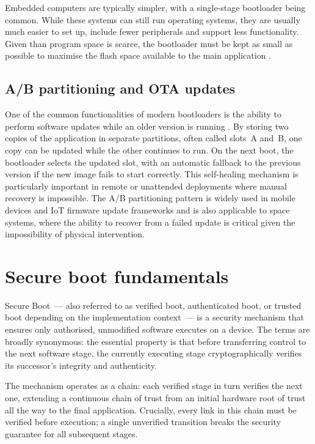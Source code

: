 Embedded computers are typically simpler, with a single-stage bootloader being common. While these systems can still run operating systems, they are usually much easier to set up, include fewer peripherals and support less functionality. Given than program space is scarce, the bootloader must be kept as small as possible to maximise the flash space available to the main application \cite{beningo_2015, wolfBoot}.

\subsection{A/B partitioning and OTA updates}
\label{subsection:bg-bootloader-ABandOTA}

One of the common functionalities of modern bootloaders is the ability to perform software updates while an older version is running \cite{android_ota_updating_2026, rfc9019, wolfBoot}. By storing two copies of the application in separate partitions, often called slots~A and~B, one copy can be updated while the other continues to run. On the next boot, the bootloader selects the updated slot, with an automatic fallback to the previous version if the new image fails to start correctly. This self-healing mechanism is particularly important in remote or unattended deployments where manual recovery is impossible. The A/B partitioning pattern is widely used in mobile devices and IoT firmware update frameworks \cite{android_ota_updating_2026, rfc9019, beningo_2015} and is also applicable to space systems, where the ability to recover from a failed update is critical given the impossibility of physical intervention.

\section{Secure boot fundamentals}
\label{section:bg-secureboot}

Secure Boot~--- also referred to as verified boot, authenticated boot, or trusted boot depending on the implementation context~--- is a security mechanism that ensures only authorised, unmodified software executes on a device. The terms are broadly synonymous: the essential property is that before transferring control to the next software stage, the currently executing stage cryptographically verifies its successor's integrity and authenticity.

The mechanism operates as a chain: each verified stage in turn verifies the next one, extending a continuous chain of trust from an initial hardware root of trust all the way to the final application. Crucially, every link in this chain must be verified before execution; a single unverified transition breaks the security guarantee for all subsequent stages.

